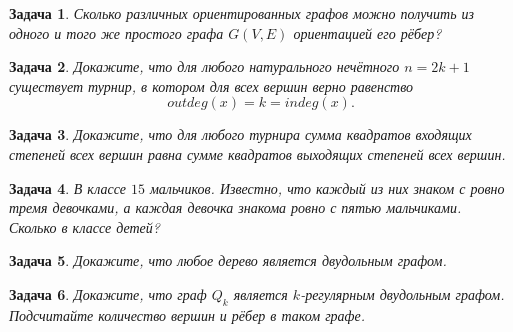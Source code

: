 \documentclass[12pt,a4paper,fleqn]{article}
\newtheorem{exersize}{Задача}
\begin{document}
\begin{exersize}
	Сколько различных ориентированных графов можно получить из одного и того же простого графа $G(V, E)$ ориентацией его рёбер?
\end{exersize}

\begin{exersize}
	Докажите, что для любого натурального нечётного $n = 2k + 1$ существует турнир, в котором для всех вершин верно равенство
	$$outdeg (x) = k = indeg (x).$$
\end{exersize}

\begin{exersize}
	Докажите, что для любого турнира сумма квадратов входящих степеней всех вершин равна сумме квадратов выходящих степеней всех вершин.
\end{exersize}

\begin{exersize}
	В классе $15$ мальчиков. Известно, что каждый из них знаком с ровно тремя девочками, а каждая девочка знакома ровно с пятью мальчиками. Сколько в классе детей?
\end{exersize}

\begin{exersize}
	Докажите, что любое дерево является двудольным графом.
\end{exersize}

\begin{exersize}
	Докажите, что граф $Q_k$ является $k$-регулярным двудольным графом. Подсчитайте количество вершин и рёбер в таком графе.
\end{exersize}
\end{document}
